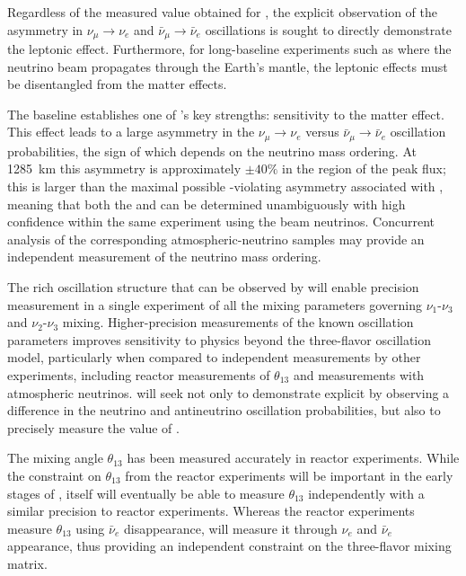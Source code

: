 Regardless of the measured value obtained for \deltacp, the explicit
observation of the asymmetry in $\nu_{\mu}
\rightarrow \nu_e$ and $\bar{\nu}_{\mu} \rightarrow
\bar{\nu}_e$ oscillations is sought to directly demonstrate the
leptonic  effect.  
Furthermore, for long-baseline
experiments such as  where the neutrino beam propagates through
the Earth's mantle, the leptonic  effects must be
disentangled from the matter effects.

The  baseline establishes one of 's key strengths: sensitivity to the matter effect. This effect leads to a large asymmetry in the $\nu_\mu\to \nu_e$ versus $\bar{\nu}_\mu \to \bar{\nu}_e$ oscillation probabilities, the sign of which depends on the neutrino mass ordering.  At 1285~km this asymmetry is approximately $\pm 40\%$ in the region of the peak flux; this is larger than the maximal possible -violating asymmetry associated with \deltacp, meaning that both the  and \deltacp can be determined
unambiguously with high confidence within the same experiment using the beam neutrinos. Concurrent analysis of the corresponding atmospheric-neutrino samples may provide an independent measurement of the neutrino mass ordering.

The rich oscillation structure that can be observed by  will enable precision measurement  in a single experiment of all the mixing parameters governing $\nu_1$-$\nu_3$ and $\nu_2$-$\nu_3$ mixing. Higher-precision measurements of the known oscillation parameters improves sensitivity to physics beyond the three-flavor oscillation model, particularly when compared to independent measurements by other experiments, including reactor measurements of $\theta_{13}$ and
measurements with atmospheric neutrinos.  will seek not only to demonstrate explicit  by observing a difference in the neutrino and antineutrino oscillation probabilities, but also to precisely measure the value of \deltacp. 

 The mixing angle $\theta_{13}$ has been measured accurately in reactor experiments. While the constraint on $\theta_{13}$ from the reactor experiments will be important in the
early stages of , 
 itself will eventually be able to measure
$\theta_{13}$ independently with a similar precision to reactor experiments. 
Whereas the reactor experiments measure $\theta_{13}$ using $\bar{\nu}_e$ disappearance,  will measure it through $\nu_e$ and $\bar{\nu}_e$ appearance, thus providing an independent constraint on
the three-flavor mixing matrix.   

